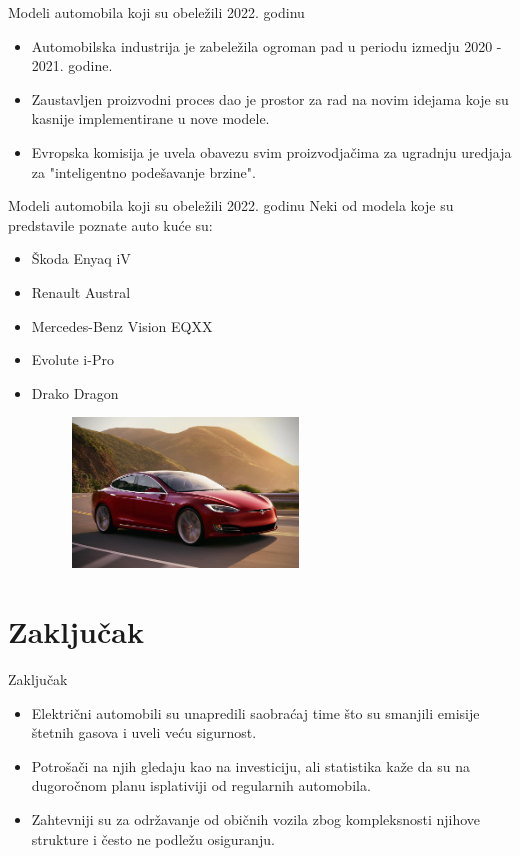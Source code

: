 \documentclass[11pt]{beamer}
\begin{document}
\begin{frame}{Modeli automobila koji su obeležili 2022. godinu}{\thesection \, \secname}

\begin{itemize}
\item Automobilska industrija je zabeležila ogroman pad u periodu izmedju 2020 - 2021. godine.
\item Zaustavljen proizvodni proces dao je prostor za rad na novim idejama koje su kasnije implementirane u nove modele.
\item Evropska komisija je uvela obavezu svim proizvodjačima za ugradnju uredjaja za "inteligentno podešavanje brzine".
\end{itemize}
\end{frame}

\begin{frame}{Modeli automobila koji su obeležili 2022. godinu}
Neki od modela koje su predstavile poznate auto kuće su:
\begin{itemize}
\item Škoda Enyaq iV
\item Renault Austral
\item Mercedes-Benz Vision EQXX
\item Evolute i-Pro
\item Drako Dragon

\begin{figure}[h]
        \centering
        \includegraphics[width=60mm, scale=0.5]{tesla.jpeg}
        \label{fig:tesla.jpeg}
        \end{figure}

\end{itemize}

\end{frame}

\section{Zaključak}

\begin{frame}{Zaključak}
\begin{itemize}
\item Električni automobili su unapredili saobraćaj time što su smanjili emisije štetnih gasova i uveli veću sigurnost.
\item Potrošači na njih gledaju kao na investiciju, ali statistika kaže da su na dugoročnom planu isplativiji od regularnih automobila.
\item Zahtevniji su za održavanje od običnih vozila zbog kompleksnosti njihove strukture i često ne podležu osiguranju.
\end{itemize}

\end{frame}
\end{document}
